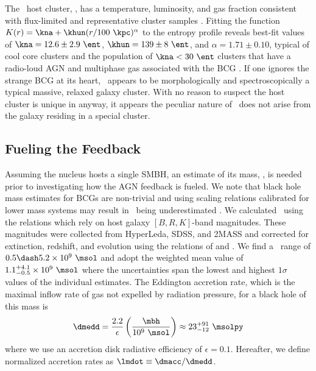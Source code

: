 \documentclass[useAMS,usenatbib]{mn2e}
\begin{document}
The \irs\ host cluster, \rxj, has a temperature, luminosity, and gas
fraction consistent with flux-limited and representative cluster
samples \citep{hiflugcs2, 2009A&A...498..361P}. Fitting the function
$K(r) = \kna +\khun (r/100 ~\kpc)^{\alpha}$ to the entropy profile
reveals best-fit values of $\kna = 12.6 \pm 2.9 ~\ent$, $\khun = 139
\pm 8 ~\ent$, and $\alpha = 1.71 \pm 0.10$, typical of cool core
clusters and the population of $\kna < 30 ~\ent$ clusters that have a
radio-loud AGN and multiphase gas associated with the BCG
\citep{haradent, rafferty08, accept, 2009MNRAS.395..764S}. If one
ignores the strange BCG at its heart, \rxj\ appears to be
morphologically and spectroscopically a typical massive, relaxed
galaxy cluster. With no reason to suspect the host cluster is unique
in anyway, it appears the peculiar nature of \irs\ does not arise from
the galaxy residing in a special cluster.

\subsection{Fueling the Feedback}

Assuming the nucleus hosts a single SMBH, an estimate of its mass,
\mbh, is needed prior to investigating how the AGN feedback is
fueled. We note that black hole mass estimates for BCGs are
non-trivial and using scaling relations calibrated for lower mass
systems may result in \mbh\ being underestimated
\citep[\eg][]{2007ApJ...662..808L, 2009ApJ...690..537D}. We calculated
\mbh\ using the \citet{2007MNRAS.379..711G} relations which rely on
host galaxy $[B,R,K]$-band magnitudes. These magnitudes were collected
from HyperLeda, SDSS, and 2MASS and corrected for extinction,
redshift, and evolution using the relations of \citet{cardelli89} and
\citet{poggianti97}. We find a \mbh\ range of $0.5 \dash 5.2 \times
10^9 ~\msol$ and adopt the weighted mean value of $1.1^{+4.1}_{-0.5}
\times 10^9 ~\msol$ where the uncertainties span the lowest and
highest $1\sigma$ values of the individual estimates. The Eddington
accretion rate, which is the maximal inflow rate of gas not expelled
by radiation pressure, for a black hole of this mass is
\begin{equation}
  \dmedd = \frac{2.2}{\epsilon} \left(\frac{\mbh}{10^9~\msol}\right)
  \approx 23^{+91}_{-12} ~\msolpy
\end{equation}
where we use an accretion disk radiative efficiency of $\epsilon =
0.1$. Hereafter, we define normalized accretion rates as $\lmdot
\equiv \dmacc/\dmedd$.
\end{document}
